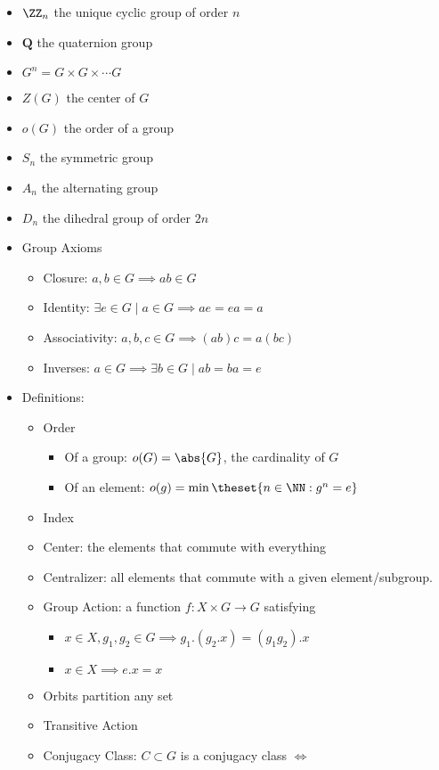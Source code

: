\begin{itemize}
\item
  \(\ZZ_n\) the unique cyclic group of order \(n\)
\item
  \(\mathbf{Q}\) the quaternion group
\item
  \(G^n = G\times G \times \cdots G\)
\item
  \(Z(G)\) the center of \(G\)
\item
  \(o(G)\) the order of a group
\item
  \(S_n\) the symmetric group
\item
  \(A_n\) the alternating group
\item
  \(D_n\) the dihedral group of order \(2n\)
\item
  Group Axioms

  \begin{itemize}
  \tightlist
  \item
    Closure: \(a,b \in G \implies ab \in G\)
  \item
    Identity: \(\exists e\in G \mid a\in G \implies ae = ea = a\)
  \item
    Associativity: \(a,b,c \in G \implies (ab)c = a(bc)\)
  \item
    Inverses: \(a\in G \implies \exists b \in G \mid ab =ba = e\)
  \end{itemize}
\item
  Definitions:

  \begin{itemize}
  \tightlist
  \item
    Order

    \begin{itemize}
    \tightlist
    \item
      Of a group: \(o(G) = \abs{G}\), the cardinality of \(G\)
    \item
      Of an element: \(o(g) = \min\theset{n\in \NN : g^n = e}\)
    \end{itemize}
  \item
    Index
  \item
    Center: the elements that commute with everything
  \item
    Centralizer: all elements that commute with a given
    element/subgroup.
  \item
    Group Action: a function \(f: X\times G \to G\) satisfying

    \begin{itemize}
    \tightlist
    \item
      \(x\in X, g_1,g_2 \in G \implies g_1.(g_2.x) = (g_1g_2). x\)
    \item
      \(x\in X \implies e.x = x\)
    \end{itemize}
  \item
    Orbits partition any set
  \item
    Transitive Action
  \item
    Conjugacy Class: \(C \subset G\) is a conjugacy class \(\iff\)


\end{itemize}
\end{itemize}
